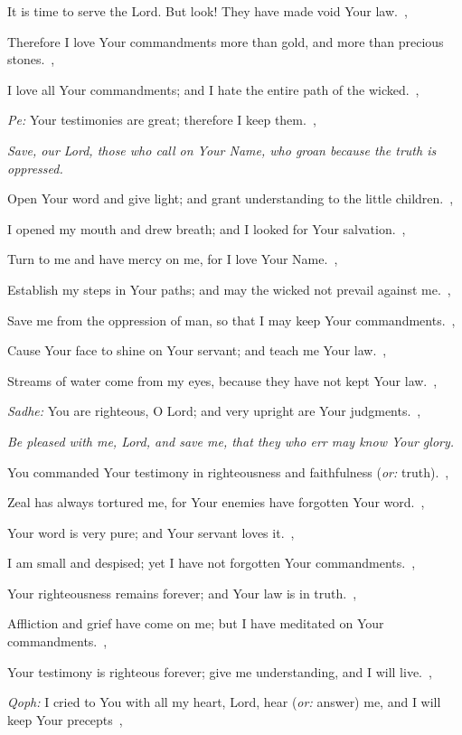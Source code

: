 \documentclass[12pt,twoside,a5paper]{article}
\newcommand{\qanona}[1]{{\liturgicalhint{Qanona.} \emph{#1}}}
\newcommand{\translationoption}[1]{\emph{or:} #1}
\begin{document}
\begin{normalparskip}
  It is time to serve the Lord. But look! They have made void Your law.~\sep

  Therefore I love Your commandments more than gold, and more than precious stones.~\sep

  I love all Your commandments; and I hate the entire path of the wicked.~\sep

  \emph{Pe:} Your testimonies are great; therefore I keep them.~\sep

  \qanona{Save, our Lord, those who call on Your Name, who groan because the truth is oppressed.}

  Open Your word and give light; and grant understanding to the little children.~\sep

  I opened my mouth and drew breath; and I looked for Your salvation.~\sep

  Turn to me and have mercy on me, for I love Your Name.~\sep

  Establish my steps in Your paths; and may the wicked not prevail against me.~\sep

  Save me from the oppression of man, so that I may keep Your commandments.~\sep

  Cause Your face to shine on Your servant; and teach me Your law.~\sep

  Streams of water come from my eyes, because they have not kept Your law.~\sep

  \emph{Sadhe:} You are righteous, O Lord; and very upright are Your judgments.~\sep

  \qanona{Be pleased with me, Lord, and save me, that they who err may know Your glory.}

  You commanded Your testimony in righteousness and faithfulness (\translationoption{truth}).~\sep

  Zeal has always tortured me, for Your enemies have forgotten Your word.~\sep

  Your word is very pure; and Your servant loves it.~\sep

  I am small and despised; yet I have not forgotten Your commandments.~\sep

  Your righteousness remains forever; and Your law is in truth.~\sep

  Affliction and grief have come on me; but I have meditated on Your commandments.~\sep

  Your testimony is righteous forever; give me understanding, and I will live.~\sep

  \emph{Qoph:} I cried to You with all my heart, Lord, hear (\translationoption{answer}) me, and I will keep Your precepts~\sep


\end{normalparskip}
\end{document}
